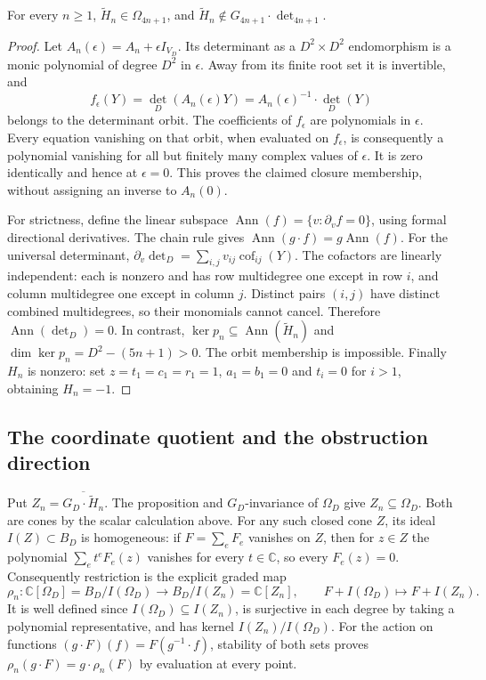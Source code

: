 \begin{proposition}\label{prop:retained-determinant-boundary}
For every $n\ge1$, $\widetilde H_n\in\Omega_{4n+1}$, and
$\widetilde H_n\notin G_{4n+1}\cdot\det_{4n+1}$.
\end{proposition}
\begin{proof}
Let $A_n(\epsilon)=A_n+\epsilon I_{V_D}$. Its determinant as a
$D^2\times D^2$ endomorphism is a monic polynomial of degree $D^2$
in $\epsilon$. Away from its finite root set it is invertible, and
\[
 f_\epsilon(Y)=\det_D(A_n(\epsilon)Y)
             =A_n(\epsilon)^{-1}\cdot\det_D(Y)
\]
belongs to the determinant orbit. The coefficients of $f_\epsilon$
are polynomials in $\epsilon$. Every equation vanishing on that orbit,
when evaluated on $f_\epsilon$, is consequently a polynomial vanishing
for all but finitely many complex values of $\epsilon$. It is zero
identically and hence at $\epsilon=0$. This proves the claimed closure
membership, without assigning an inverse to $A_n(0)$.

For strictness, define the linear subspace
$\operatorname{Ann}(f)=\{v:\partial_v f=0\}$, using formal directional
derivatives. The chain rule gives
$\operatorname{Ann}(g\cdot f)=g\operatorname{Ann}(f)$.
For the universal determinant,
$\partial_v\det_D=\sum_{i,j}v_{ij}\operatorname{cof}_{ij}(Y)$.
The cofactors are linearly independent: each is nonzero and has row
multidegree one except in row $i$, and column multidegree one except
in column $j$. Distinct pairs $(i,j)$ have distinct combined
multidegrees, so their monomials cannot cancel. Therefore
$\operatorname{Ann}(\det_D)=0$. In contrast,
$\ker p_n\subseteq\operatorname{Ann}(\widetilde H_n)$ and
$\dim\ker p_n=D^2-(5n+1)>0$. The orbit membership is impossible.
Finally $H_n$ is nonzero: set $z=t_1=c_1=r_1=1$, $a_1=b_1=0$
and $t_i=0$ for $i>1$, obtaining $H_n=-1$.
\end{proof}

\subsection{The coordinate quotient and the obstruction direction}

Put $Z_n=\overline{G_D\cdot\widetilde H_n}$. The proposition and
$G_D$-invariance of $\Omega_D$ give $Z_n\subseteq\Omega_D$.
Both are cones by the scalar calculation above. For any such closed
cone $Z$, its ideal $I(Z)\subset B_D$ is homogeneous: if
$F=\sum_eF_e$ vanishes on $Z$, then for $z\in Z$ the polynomial
$\sum_e t^eF_e(z)$ vanishes for every $t\in\mathbb C$, so every
$F_e(z)=0$. Consequently restriction is the explicit graded map
\[
 \rho_n:\mathbb C[\Omega_D]=B_D/I(\Omega_D)
 \longrightarrow B_D/I(Z_n)=\mathbb C[Z_n],\qquad
 F+I(\Omega_D)\longmapsto F+I(Z_n).
\]
It is well defined since $I(\Omega_D)\subseteq I(Z_n)$, is surjective
in each degree by taking a polynomial representative, and has kernel
$I(Z_n)/I(\Omega_D)$. For the action on functions
$(g\cdot F)(f)=F(g^{-1}\cdot f)$, stability of both sets proves
$\rho_n(g\cdot F)=g\cdot\rho_n(F)$ by evaluation at every point.

